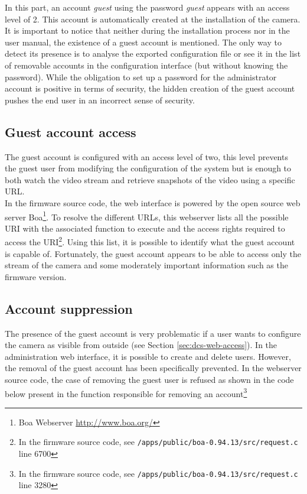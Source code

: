 In this part, an account \emph{guest} using the password \emph{guest} appears with an access level of 2.
This account is automatically created at the installation of the camera.\\

It is important to notice that neither during the installation process nor in the user manual, the existence of a guest account is mentioned.
The only way to detect its presence is to analyse the exported configuration file or see it in the list of removable accounts in the configuration interface (but without knowing the password).
While the obligation to set up a password for the administrator account is positive in terms of security, the hidden creation of the guest account pushes the end user in an incorrect sense of security.

\subsection{Guest account access}
\label{sec:dcs-guest-rights}

The guest account is configured with an access level of two, this level prevents the guest user from modifying the configuration of the system but is enough to both watch the video stream and retrieve snapshots of the video using a specific URL.\\

In the firmware source code, the web interface is powered by the open source web server Boa\footnote{Boa Webserver \url{http://www.boa.org/}}.
To resolve the different URLs, this webserver lists all the possible URI with the associated function to execute and the access rights required to access the URI\footnote{In the firmware source code, see \texttt{/apps/public/boa-0.94.13/src/request.c} line 6700}.
Using this list, it is possible to identify what the guest account is capable of.
Fortunately, the guest account appears to be able to access only the stream of the camera and some moderately important information such as the firmware version.

\subsection{Account suppression}
\label{sec:dcs-guest-suppression}

The presence of the guest account is very problematic if a user wants to configure the camera as visible from outside (see Section \ref{sec:dcs-web-access}).
In the administration web interface, it is possible to create and delete users.
However, the removal of the guest account has been specifically prevented.
In the webserver source code, the case of removing the guest user is refused as shown in the code below present in the function responsible for removing an account\footnote{In the firmware source code, see \texttt{/apps/public/boa-0.94.13/src/request.c} line 3280}

